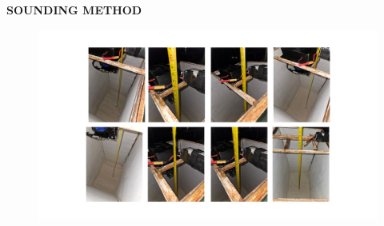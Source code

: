 \newpage

\textbf{SOUNDING METHOD}

\begin{figure}[H]
	\centering
	\includegraphics[width=1\textwidth]{Figures/test3-traditional}
\end{figure}